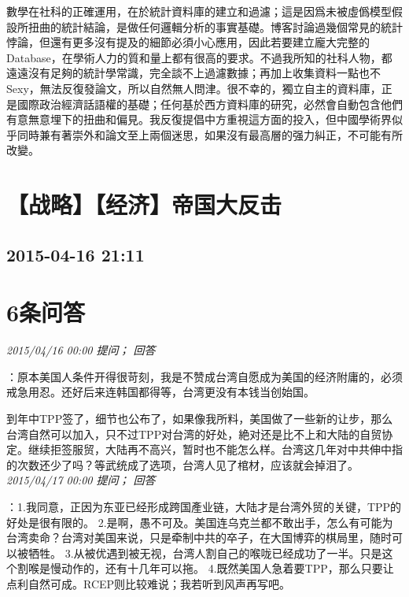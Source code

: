 \documentclass[twocolumn]{ctexart}
\begin{document}
數學在社科的正確運用，在於統計資料庫的建立和過濾；這是因爲未被虛僞模型假設所扭曲的統計結論，是做任何邏輯分析的事實基礎。博客討論過幾個常見的統計悖論，但還有更多沒有提及的細節必須小心應用，因此若要建立龐大完整的Database，在學術人力的質和量上都有很高的要求。不過我所知的社科人物，都遠遠沒有足夠的統計學常識，完全談不上過濾數據；再加上收集資料一點也不Sexy，無法反復發論文，所以自然無人問津。很不幸的，獨立自主的資料庫，正是國際政治經濟話語權的基礎；任何基於西方資料庫的研究，必然會自動包含他們有意無意埋下的扭曲和偏見。我反復提倡中方重視這方面的投入，但中國學術界似乎同時兼有著崇外和論文至上兩個迷思，如果沒有最高層的强力糾正，不可能有所改變。
\\


\section{【战略】【经济】帝国大反击}
\subsection{2015-04-16 21:11}


\section{6条问答}

\textit{\hfill\noindent\small 2015/04/16 00:00 提问； 回答}

：原本美国人条件开得很苛刻，我是不赞成台湾自愿成为美国的经济附庸的，必须戒急用忍。还好后来连韩国都得等，台湾更没有本钱当创始国。

到年中TPP签了，细节也公布了，如果像我所料，美国做了一些新的让步，那么台湾自然可以加入，只不过TPP对台湾的好处，絶对还是比不上和大陆的自贸协定。继续拒签服贸，大陆再不高兴，暂时也不能怎么样。台湾这几年对中共伸中指的次数还少了吗？等武统成了选项，台湾人见了棺材，应该就会掉泪了。\\

\textit{\hfill\noindent\small 2015/04/17 00:00 提问； 回答}

：1.我同意，正因为东亚已经形成跨国產业链，大陆才是台湾外贸的关键，TPP的好处是很有限的。
2.是啊，愚不可及。美国连乌克兰都不敢出手，怎么有可能为台湾卖命？台湾对美国来说，只是牵制中共的卒子，在大国博弈的棋局里，随时可以被牺牲。
3.从被优遇到被无视，台湾人割自己的喉咙已经成功了一半。只是这个割喉是慢动作的，还有十几年可以拖。
4.既然美国人急着要TPP，那么只要让点利自然可成。RCEP则比较难说；我若听到风声再写吧。\\
\end{document}
